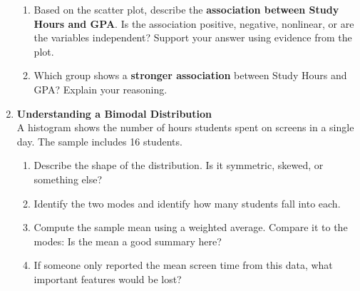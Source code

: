 \documentclass{article}
\begin{document}
\begin{enumerate}
\begin{enumerate}
    \item Based on the scatter plot, describe the \textbf{association between Study Hours and GPA}. Is the association positive, negative, nonlinear, or are the variables independent? Support your answer using evidence from the plot.

    \item Which group shows a \textbf{stronger association} between Study Hours and GPA? Explain your reasoning.
\end{enumerate}


\item \textbf{Understanding a Bimodal Distribution} \\
A histogram shows the number of hours students spent on screens in a single day. The sample includes 16 students.

\begin{center}
\end{center}

\begin{enumerate}
    \item Describe the shape of the distribution. Is it symmetric, skewed, or something else?
    \item Identify the two modes and identify how many students fall into each.
    \item Compute the sample mean using a weighted average. Compare it to the modes: Is the mean a good summary here?
    \item If someone only reported the mean screen time from this data, what important features would be lost?
\end{enumerate}


\end{enumerate}
\end{document}
